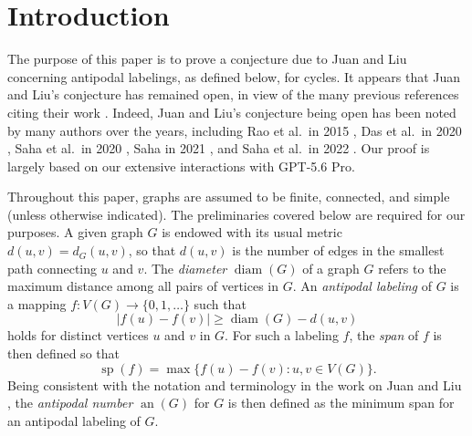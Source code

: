 \documentclass[12pt]{article}
\begin{document}
\vspace{0.1in}


 
 \section{Introduction}
 The purpose of this paper is to prove a conjecture due to Juan and Liu \cite{JuanLiu2012} concerning antipodal labelings, as defined 
 below, for cycles. It appears that Juan and Liu's conjecture has remained open, in view of the many previous references citing their work 
 \cite{BasuniaDasSahaTiwary2021,BloomfieldLiuRamirez2022,DasSahaTiwary2020,Gallian1998,
GomathiVenugopal2022,KumarPanigrahi2026,RaoKolaPanigrahi2015,Saha2020,Saha2021,SahaBasuniaDasTiwary2022,
SahaDasDasTiwary2020,SahaPanigrahi2015}. 
 Indeed, Juan and Liu's conjecture being open has been noted by many authors over the years, including Rao et al.\ in 2015 
 \cite{RaoKolaPanigrahi2015}, Das et al.\ in 2020 \cite{DasSahaTiwary2020}, Saha et al.\ in 2020 \cite{SahaDasDasTiwary2020}, 
 Saha in 2021 \cite{Saha2021}, 
 and Saha et al.\ in 2022 \cite{SahaBasuniaDasTiwary2022}. 
 Our proof is largely based on our extensive interactions with GPT-5.6 Pro. 

 Throughout this paper, graphs are assumed to be finite, connected, and simple (unless otherwise indicated). The preliminaries covered 
 below are required for our purposes. A given graph $G$ is endowed with its usual metric $d(u, v) = d_{G}(u, v)$, so that $d(u, v)$ is the 
 number of edges in the smallest path connecting $u$ and $v$. The \emph{diameter} $\operatorname{diam}(G)$ of a graph $G$ refers 
 to the maximum distance among all pairs of vertices in $G$. 
 An \emph{antipodal labeling} of $G$ is a mapping 
 $f\colon V(G) \to \{ 0, 1, \ldots \}$
 such that 
\begin{equation}\label{antipodalcondition}
 |f(u) - f(v)| \geq \operatorname{diam}(G) - d(u, v)
\end{equation}
 holds for distinct vertices $u$ and $v$ in $G$. For such a labeling $f$, the \emph{span} of $f$ is then defined so that 
\begin{equation}\label{displayspan} 
 \operatorname{sp}(f) = \max\{ f(u) - f(v) : u, v \in V(G) \}. 
\end{equation} 
 Being consistent with the notation and terminology in the work on Juan and Liu \cite{JuanLiu2012}, 
 the \emph{antipodal number} $\operatorname{an}(G)$
 for $G$ is then defined as the minimum span for an antipodal labeling of $G$. 
\end{document}
